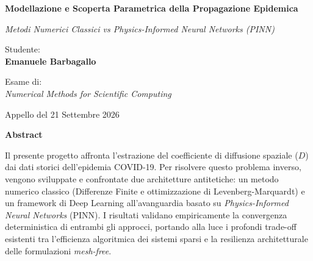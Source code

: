 \documentclass[12pt,a4paper]{article}
\begin{document}
\begin{titlepage}
    \centering
    \vspace*{2cm}
    
    {\huge\bfseries Modellazione e Scoperta Parametrica della Propagazione Epidemica\par}
    \vspace{0.8cm}
    {\Large\itshape Metodi Numerici Classici vs Physics-Informed Neural Networks (PINN)\par}
    
    \vspace{3cm}
    {\Large Studente: \\ \textbf{Emanuele Barbagallo}\par}
    \vspace{1.5cm}
    {\large Esame di: \\ \textit{Numerical Methods for Scientific Computing}\par}
    
    \vfill
    
    {\large Appello del 21 Settembre 2026\par}
\end{titlepage}

\newpage
\thispagestyle{empty}
\vspace*{4cm}
\begin{center}
    \textbf{\huge Abstract}
\end{center}
\vspace{1cm}
Il presente progetto affronta l'estrazione del coefficiente di diffusione spaziale ($D$) dai dati storici dell'epidemia COVID-19. Per risolvere questo problema inverso, vengono sviluppate e confrontate due architetture antitetiche: un metodo numerico classico (Differenze Finite e ottimizzazione di Levenberg-Marquardt) e un framework di Deep Learning all'avanguardia basato su \textit{Physics-Informed Neural Networks} (PINN). I risultati validano empiricamente la convergenza deterministica di entrambi gli approcci, portando alla luce i profondi trade-off esistenti tra l'efficienza algoritmica dei sistemi sparsi e la resilienza architetturale delle formulazioni \textit{mesh-free}.
\end{document}
